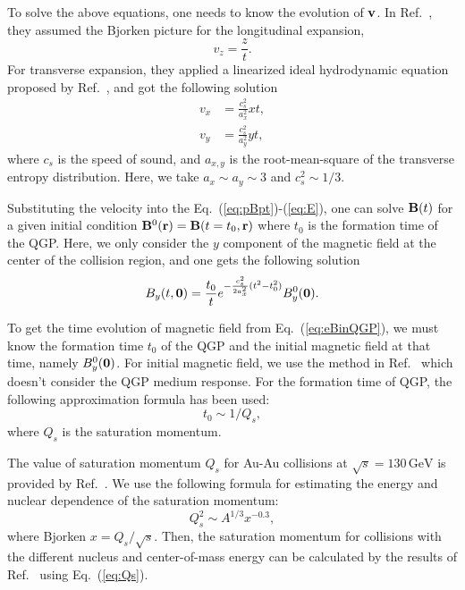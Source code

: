 \documentclass[preprint]{elsarticle}
\begin{document}
To solve the above equations, one needs to know the evolution of $\vb{v}$. In Ref.~\cite{Deng:2012pc}, they assumed the Bjorken picture for the longitudinal expansion,
\begin{equation}
v_z = \frac{z}{t}.
\end{equation}
For transverse expansion, they applied a linearized ideal hydrodynamic equation proposed by Ref.~\cite{Ollitrault:2008zz}, and got the following solution
\begin{align}
v_x &= \frac{c_s^2}{a_x^2} xt, \\
v_y &= \frac{c_s^2}{a_y^2} yt,
\end{align}
where $c_s$ is the speed of sound, and $a_{x,y}$ is the root-mean-square of the transverse entropy distribution. Here, we take $a_x \sim a_y \sim 3$ and $c_s^2 \sim 1/3$.

Substituting the velocity into the Eq.~(\ref{eq:pBpt})-(\ref{eq:E}), one can solve $\vb{B}(t)$ for a given initial condition $\vb{B}^0(\vb{r}) = \vb{B}(t=t_0, \vb{r})$ where $t_0$ is the formation time of the QGP. Here, we only consider the $y$ component of the magnetic field at the center of the collision region, and one gets the following solution
\begin{equation}
B_y(t,\vb{0}) = \frac{t_0}{t} e^{-\frac{c_s^2}{2a_x^2}(t^2 - t_0^2)} B_y^0(\vb{0}). \label{eq:eBinQGP}
\end{equation}

To get the time evolution of magnetic field from Eq.~(\ref{eq:eBinQGP}), we must know the formation time $t_0$ of the QGP and the initial magnetic field at that time, namely $B_y^0(\vb{0})$. For initial magnetic field, we use the method in Ref.~\cite{Mo:2013qya} which doesn't consider the QGP medium response. For the formation time of QGP, the following approximation formula has been used:
\begin{equation}
t_0 \sim 1 / Q_{s},
\end{equation}
where $Q_s$ is the saturation momentum.

The value of saturation momentum $Q_s$ for Au-Au collisions at $\sqrt{s} = 130\,\mathrm{GeV}$ is provided by Ref.~\cite{Kharzeev:2000ph}. We use the following formula for estimating the energy and nuclear dependence of the saturation momentum\cite{Kowalski:2007rw}:
\begin{equation}
Q_s^2 \sim A^{1/3} x^{-0.3}, \label{eq:Qs}
\end{equation}
where Bjorken $x = Q_s/\sqrt{s}$. Then, the saturation momentum for collisions with the different nucleus and center-of-mass energy can be calculated by the results of Ref.~\cite{Kharzeev:2000ph} using Eq.~(\ref{eq:Qs}).
\end{document}
